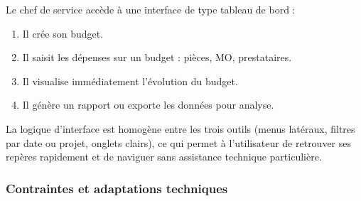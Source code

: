 \documentclass[11pt,a4paper]{article}
\begin{document}
Le chef de service accède à une interface de type tableau de bord :
\begin{enumerate}
    \item Il crée son budget.
    \item Il saisit les dépenses sur un budget : pièces, MO, prestataires.
    \item Il visualise immédiatement l’évolution du budget.
    \item Il génère un rapport ou exporte les données pour analyse.
\end{enumerate}

La logique d’interface est homogène entre les trois outils (menus latéraux, filtres par date ou projet, onglets clairs), ce qui permet à l’utilisateur de retrouver ses repères rapidement et de naviguer sans assistance technique particulière.

\subsubsection{Contraintes et adaptations techniques}
\end{document}
